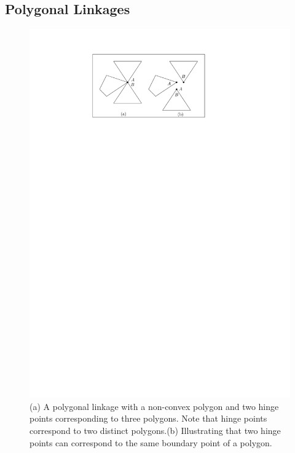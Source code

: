 \subsection{Polygonal Linkages}
\begin{figure}[h]
\begin{center}
\includegraphics[scale=1]{graphics/hingeOnThreeDistinctPolygons.pdf}
\end{center} 
\caption{(a) A polygonal linkage with a non-convex polygon and two hinge points corresponding to 
three polygons.  Note that hinge points correspond to two distinct polygons.(b) Illustrating that 
two hinge points can correspond to the same boundary point of a polygon.}
\label{fig:linkage-1}
\end{figure}
